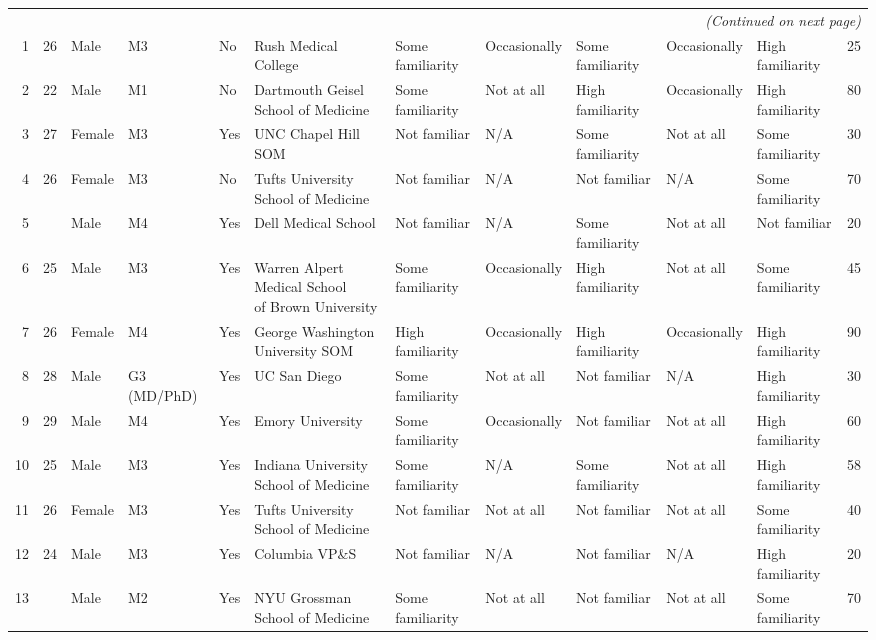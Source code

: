 \documentclass[11pt]{article}
\begin{document}
\begin{landscape}
{\begin{longtable}{rlllllllllll}
\midrule
\multicolumn{12}{r}{\textit{(Continued on next page)}}\\
\endfoot

\bottomrule
\endlastfoot
1 & 26 & Male & M3 & No & Rush Medical College & Some familiarity & Occasionally & Some familiarity & Occasionally & High familiarity & 25 \\
2 & 22 & Male & M1 & No & Dartmouth Geisel School of Medicine & Some familiarity & Not at all & High familiarity & Occasionally & High familiarity & 80 \\
3 & 27 & Female & M3 & Yes & UNC Chapel Hill SOM & Not familiar & N/A & Some familiarity & Not at all & Some familiarity & 30 \\
4 & 26 & Female & M3 & No & Tufts University School of Medicine & Not familiar & N/A & Not familiar & N/A & Some familiarity & 70 \\
5 & \multicolumn{1}{l}{} & Male & M4 & Yes & Dell Medical School & Not familiar & N/A & Some familiarity & Not at all & Not familiar & 20 \\
6 & 25 & Male & M3 & Yes & \makecell[l]{Warren Alpert Medical School\\ of Brown University} & Some familiarity & Occasionally & High familiarity & Not at all & Some familiarity & 45 \\
7 & 26 & Female & M4 & Yes & George Washington University SOM & High familiarity & Occasionally & High familiarity & Occasionally & High familiarity & 90 \\
8 & 28 & Male & G3 (MD/PhD) & Yes & UC San Diego & Some familiarity & Not at all & Not familiar & N/A & High familiarity & 30 \\
9 & 29 & Male & M4 & Yes & Emory University & Some familiarity & Occasionally & Not familiar & Not at all & High familiarity & 60 \\
10 & 25 & Male & M3 & Yes & Indiana University School of Medicine & Some familiarity & N/A & Some familiarity & Not at all & High familiarity & 58 \\
11 & 26 & Female & M3 & Yes & Tufts University School of Medicine & Not familiar & Not at all & Not familiar & Not at all & Some familiarity & 40 \\
12 & 24 & Male & M3 & Yes & Columbia VP\&S & Not familiar & N/A & Not familiar & N/A & High familiarity & 20 \\
13 & \multicolumn{1}{l}{} & Male & M2 & Yes & NYU Grossman School of Medicine & Some familiarity & Not at all & Not familiar & Not at all & Some familiarity & 70 \\

\end{longtable}}
\end{landscape}
\end{document}
